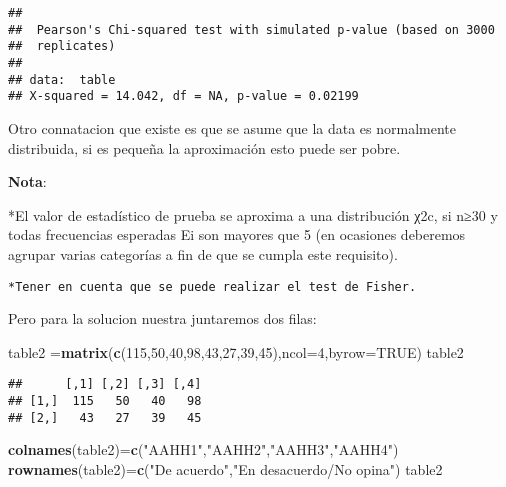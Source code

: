 \documentclass[
]{article}
\newenvironment{Shaded}{\begin{snugshade}}{\end{snugshade}}
\newcommand{\DataTypeTok}[1]{\textcolor[rgb]{0.13,0.29,0.53}{#1}}
\newcommand{\DecValTok}[1]{\textcolor[rgb]{0.00,0.00,0.81}{#1}}
\newcommand{\KeywordTok}[1]{\textcolor[rgb]{0.13,0.29,0.53}{\textbf{#1}}}
\newcommand{\NormalTok}[1]{#1}
\newcommand{\OtherTok}[1]{\textcolor[rgb]{0.56,0.35,0.01}{#1}}
\newcommand{\StringTok}[1]{\textcolor[rgb]{0.31,0.60,0.02}{#1}}
\begin{document}
\begin{verbatim}
## 
##  Pearson's Chi-squared test with simulated p-value (based on 3000
##  replicates)
## 
## data:  table
## X-squared = 14.042, df = NA, p-value = 0.02199
\end{verbatim}

Otro connatacion que existe es que se asume que la data es normalmente
distribuida, si es pequeña la aproximación esto puede ser pobre.

\textbf{Nota}:

*El valor de estadístico de prueba se aproxima a una distribución χ2c,
si n≥30 y todas frecuencias esperadas Ei son mayores que 5 (en ocasiones
deberemos agrupar varias categorías a fin de que se cumpla este
requisito).

\begin{verbatim}
*Tener en cuenta que se puede realizar el test de Fisher.
\end{verbatim}

Pero para la solucion nuestra juntaremos dos filas:

\begin{Shaded}
\begin{Highlighting}[]
\NormalTok{table2 =}\KeywordTok{matrix}\NormalTok{(}\KeywordTok{c}\NormalTok{(}\DecValTok{115}\NormalTok{,}\DecValTok{50}\NormalTok{,}\DecValTok{40}\NormalTok{,}\DecValTok{98}\NormalTok{,}\DecValTok{43}\NormalTok{,}\DecValTok{27}\NormalTok{,}\DecValTok{39}\NormalTok{,}\DecValTok{45}\NormalTok{),}\DataTypeTok{ncol=}\DecValTok{4}\NormalTok{,}\DataTypeTok{byrow=}\OtherTok{TRUE}\NormalTok{)}
\NormalTok{table2}
\end{Highlighting}
\end{Shaded}

\begin{verbatim}
##      [,1] [,2] [,3] [,4]
## [1,]  115   50   40   98
## [2,]   43   27   39   45
\end{verbatim}

\begin{Shaded}
\begin{Highlighting}[]
\KeywordTok{colnames}\NormalTok{(table2)=}\KeywordTok{c}\NormalTok{(}\StringTok{"AAHH1"}\NormalTok{,}\StringTok{"AAHH2"}\NormalTok{,}\StringTok{"AAHH3"}\NormalTok{,}\StringTok{"AAHH4"}\NormalTok{)}
\KeywordTok{rownames}\NormalTok{(table2)=}\KeywordTok{c}\NormalTok{(}\StringTok{"De acuerdo"}\NormalTok{,}\StringTok{"En desacuerdo/No opina"}\NormalTok{)}
\NormalTok{table2}
\end{Highlighting}
\end{Shaded}
\end{document}
